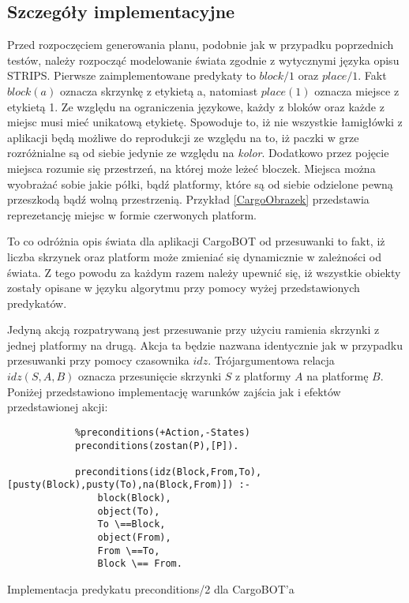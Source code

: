     \subsection{Szczegóły implementacyjne}
    Przed rozpoczęciem generowania planu, podobnie jak w przypadku poprzednich testów, należy rozpocząć modelowanie świata zgodnie z wytycznymi 
    języka opisu STRIPS. Pierwsze zaimplementowane predykaty to $block/1$ oraz $place/1$. Fakt $block(a)$ oznacza skrzynkę z etykietą a, natomiast 
    $place(1)$ oznacza miejsce z etykietą 1. Ze względu na ograniczenia językowe, każdy z bloków oraz każde z miejsc musi mieć unikatową etykietę. 
    Spowoduje to, iż nie wszystkie łamigłówki z aplikacji będą możliwe do reprodukcji ze względu na to, iż paczki w grze rozróżnialne są od siebie 
    jedynie ze względu na \textit{kolor}. Dodatkowo przez pojęcie miejsca rozumie się przestrzeń, na której może leżeć bloczek. Miejsca można
    wyobrażać sobie jakie półki, bądź platformy, które są od siebie odzielone pewną przeszkodą bądź wolną przestrzenią. Przykład \ref{CargoObrazek}
    przedstawia reprezetancję miejsc w formie czerwonych platform. 
    
    To co odróżnia opis świata dla aplikacji CargoBOT od przesuwanki to fakt, iż liczba skrzynek oraz platform może zmieniać się dynamicznie w zależności 
    od świata. Z tego powodu za każdym razem należy upewnić się, iż wszystkie obiekty zostały opisane w języku algorytmu przy pomocy wyżej przedstawionych 
    predykatów. 

    Jedyną akcją rozpatrywaną jest przesuwanie przy użyciu ramienia skrzynki z jednej platformy na drugą. Akcja ta będzie nazwana identycznie jak w 
    przypadku przesuwanki przy pomocy czasownika $idz$. Trójargumentowa relacja $idz(S,A,B)$ oznacza przesunięcie skrzynki $S$ z platformy $A$
    na platformę $B$. Poniżej przedstawiono implementację warunków zajścia jak i efektów przedstawionej akcji:

    \begin{listing}[H]
        \begin{verbatim}
            %preconditions(+Action,-States)
            preconditions(zostan(P),[P]).

            preconditions(idz(Block,From,To), [pusty(Block),pusty(To),na(Block,From)]) :-
                block(Block),
                object(To),
                To \==Block,
                object(From),
                From \==To,
                Block \== From.
        \end{verbatim}
    \caption{Implementacja predykatu preconditions/2 dla CargoBOT'a}
    \end{listing}

